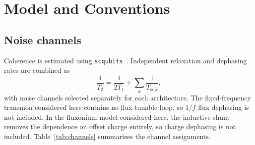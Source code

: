 \documentclass{SciPost}
\begin{document}
\section{Model and Conventions}

\subsection{Noise channels}
\label{sec:model}

Coherence is estimated using \texttt{scqubits}~\cite{groszkowski2021}. Independent relaxation and
dephasing rates are combined as
\begin{equation}
\frac{1}{T_2} = \frac{1}{2T_1} + \sum_k \frac{1}{T_{\phi,k}},
\label{eq:rates}
\end{equation}
with noise channels selected separately for each architecture. The fixed-frequency transmon
considered here contains no flux-tunable loop, so $1/f$ flux dephasing is not included. In the
fluxonium model considered here, the inductive shunt removes the dependence on offset charge
entirely, so charge dephasing is not included. Table~\ref{tab:channels} summarizes the channel
assignments.
\end{document}
